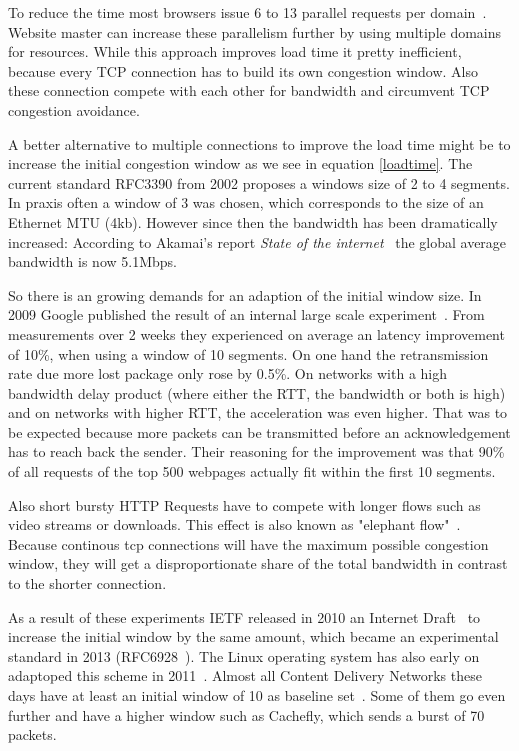 To reduce the time most browsers issue 6 to 13 parallel requests per
domain~\cite{browserscope}. Website master can increase these parallelism
further by using multiple domains for resources. While this approach improves
load time it pretty inefficient, because every TCP connection has to build its
own congestion window. Also these connection compete with each other for
bandwidth and circumvent TCP congestion avoidance.

A better alternative to multiple connections to improve the load time might be
to increase the initial congestion window as we see in equation \ref{loadtime}.
The current standard RFC3390 from 2002 proposes a windows size of 2 to 4
segments. In praxis often a window of 3 was chosen, which corresponds to the
size of an Ethernet MTU (4kb). However since then the bandwidth has been
dramatically increased: According to Akamai's report \emph{State of the
internet}~\cite{q3-2015-soti-connectivity-final} the global average bandwidth is
now 5.1Mbps.

So there is an growing demands for an adaption of the initial window size. In
2009 Google published the result of an internal large scale
experiment~\cite{36640}. From measurements over 2 weeks they experienced on
average an latency improvement of 10\%, when using a window of 10 segments. On
one hand the retransmission rate due more lost package only rose by 0.5\%. On
networks with a high bandwidth delay product (where either the RTT, the
bandwidth or both is high) and on networks with higher RTT, the acceleration was
even higher. That was to be expected because more packets can be transmitted
before an acknowledgement has to reach back the sender. Their reasoning for the
improvement was that 90\% of all requests of the top 500 webpages actually fit
within the first 10 segments.

Also short bursty HTTP Requests have to compete with longer flows such as video
streams or downloads. This effect is also known as "elephant
flow"~\cite{992898}. Because continous tcp connections will have the maximum
possible congestion window, they will get a disproportionate share of the total
bandwidth in contrast to the shorter connection.

As a result of these experiments IETF released in 2010 an Internet
Draft~\cite{draft-ietf-tcpm-initcwnd-00} to increase the initial window by the
same amount, which became an experimental standard in 2013
(RFC6928~\cite{rfc6928}). The Linux operating system has also early on adaptoped
this scheme in 2011~\cite{linux}. Almost all Content Delivery Networks these
days have at least an initial window of 10 as baseline set~\cite{cdnplanet}.
Some of them go even further and have a higher window such as Cachefly, which
sends a burst of 70 packets.
